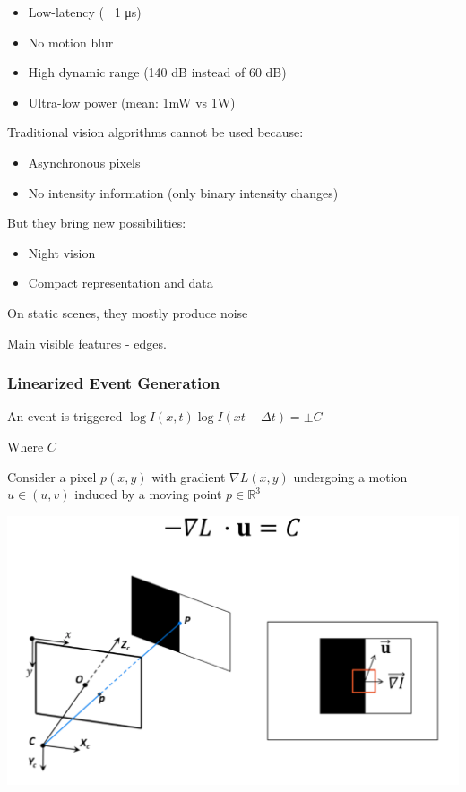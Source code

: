 \begin{itemize}
\item Low-latency (~ 1 μs)
\item No motion blur
\item High dynamic range (140 dB instead of 60 dB)
\item Ultra-low power (mean: 1mW vs 1W)
\end{itemize}

Traditional vision algorithms cannot be used because:
\begin{itemize}
\item Asynchronous pixels
\item No intensity information (only binary intensity changes)
\end{itemize}

But they bring new possibilities:
\begin{itemize}
\item Night vision
\item Compact representation and data
\end{itemize}

On static scenes, they mostly produce noise

Main visible features - edges. 

\subsubsection{Linearized Event Generation}

An event is triggered $\log I(x,t) \log I(xt-\Delta t)=\pm C$

Where $C$ 

Consider a pixel $p(x,y)$ with gradient $\nabla L(x,y)$ undergoing a motion $u\in(u,v)$ induced by a moving point $p \in\mathbb{R}^3 $

\includegraphics{event_cameras_fig/event_cameras.png}

